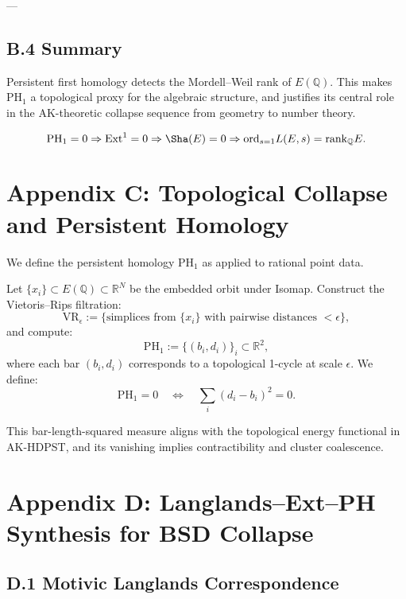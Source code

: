 ---

\subsection*{B.4 Summary}

Persistent first homology detects the Mordell--Weil rank of \( E(\mathbb{Q}) \).  
This makes \( \mathrm{PH}_1 \) a topological proxy for the algebraic structure, and justifies its central role  
in the AK-theoretic collapse sequence from geometry to number theory.

\[
\mathrm{PH}_1 = 0 \Rightarrow \mathrm{Ext}^1 = 0 \Rightarrow \Sha(E) = 0 \Rightarrow \mathrm{ord}_{s=1}L(E,s) = \mathrm{rank}_{\mathbb{Q}}E.
\]



\section*{Appendix C: Topological Collapse and Persistent Homology}

We define the persistent homology \( \mathrm{PH}_1 \) as applied to rational point data.

Let \( \{x_i\} \subset E(\mathbb{Q}) \subset \mathbb{R}^N \) be the embedded orbit under Isomap.  
Construct the Vietoris–Rips filtration:
\[
\mathrm{VR}_\epsilon := \{ \text{simplices from } \{x_i\} \text{ with pairwise distances } < \epsilon \},
\]
and compute:
\[
\mathrm{PH}_1 := \{ (b_i, d_i) \}_{i} \subset \mathbb{R}^2,
\]
where each bar \( (b_i, d_i) \) corresponds to a topological 1-cycle at scale \( \epsilon \).  
We define:
\[
\mathrm{PH}_1 = 0 \quad \Leftrightarrow \quad \sum_i (d_i - b_i)^2 = 0.
\]

This bar-length-squared measure aligns with the topological energy functional in AK-HDPST, and its vanishing implies contractibility and cluster coalescence.

\section*{Appendix D: Langlands--Ext--PH Synthesis for BSD Collapse}

\subsection*{D.1 Motivic Langlands Correspondence}

